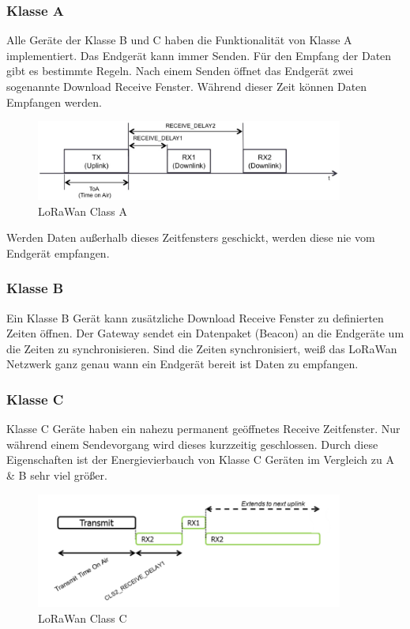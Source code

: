 \documentclass[11pt,english,german]{report}
\theoremstyle{definition}
\begin{document}
\subsubsection{Klasse A}
Alle Geräte der Klasse B und C haben die Funktionalität von Klasse A implementiert. Das Endgerät kann immer Senden. Für den Empfang der Daten gibt es bestimmte Regeln. Nach einem Senden öffnet das Endgerät zwei sogenannte Download Receive Fenster. Während dieser Zeit können Daten Empfangen werden. 

\begin{figure}[H]
	\centering
	\includegraphics[width=0.9\textwidth]{img/lorawan_class_a.png}
	\caption[LoRaWan Class A]
	{LoRaWan Class A}
\end{figure}
Werden Daten außerhalb dieses Zeitfensters geschickt, werden diese nie vom Endgerät empfangen.

\subsubsection{Klasse B}
Ein Klasse B Gerät kann zusätzliche Download Receive Fenster zu definierten Zeiten öffnen. Der Gateway sendet ein Datenpaket (Beacon) an die Endgeräte um die Zeiten zu synchronisieren. Sind die Zeiten synchronisiert, weiß das LoRaWan Netzwerk ganz genau wann ein Endgerät bereit ist Daten zu empfangen. 

\subsubsection{Klasse C}
Klasse C Geräte haben ein nahezu permanent geöffnetes Receive Zeitfenster. Nur während einem Sendevorgang wird dieses kurzzeitig geschlossen. Durch diese Eigenschaften ist der Energievierbauch von Klasse C Geräten im Vergleich zu A \& B sehr viel größer.

\begin{figure}[H]
	\centering
	\includegraphics[width=0.9\textwidth]{img/lorawan_class_c.png}
	\caption[LoRaWan Class C]
	{LoRaWan Class C}
\end{figure}
\end{document}
